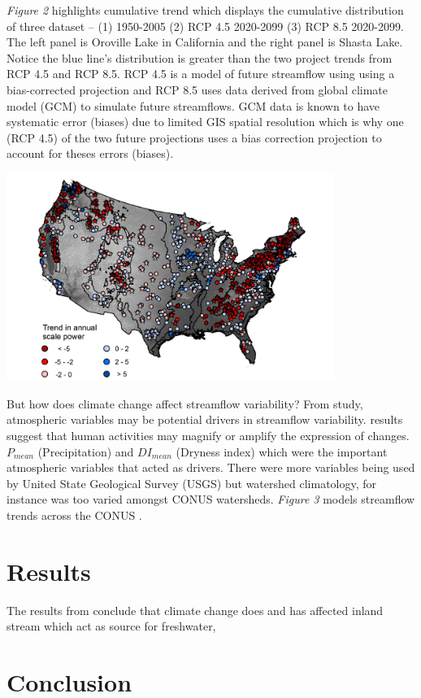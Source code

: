 \documentclass[a4paper,man,biblatex]{apa6}
\begin{document}
\par \textit{Figure 2} highlights cumulative trend which displays the cumulative distribution of three dataset -- (1) 1950-2005 (2) RCP 4.5 2020-2099 (3) RCP 8.5 2020-2099. The left panel is Oroville Lake in California and the right panel is Shasta Lake. Notice the blue line's distribution is greater than the two project trends from RCP 4.5 and RCP 8.5. RCP 4.5 is a model of future streamflow using using a bias-corrected projection and RCP 8.5 uses data derived from global climate model (GCM) to simulate future streamflows. GCM data is known to have systematic error (biases) due to limited GIS spatial resolution which is why one (RCP 4.5) of the two future projections uses a bias correction projection to account for theses errors (biases).
\begin{center}
    \includegraphics[width=0.8\textwidth]{conus_trend}
    \label{fig:cdf}
\end{center}
\par But how does climate change affect streamflow variability? From \textcite{rice_2016} study, atmospheric variables may be potential drivers in streamflow variability. \textcite{rice_2016} results suggest that human activities may magnify or amplify the expression of changes. $P_\textit{mean}$ (Precipitation) and $DI_\textit{mean}$ (Dryness index) which were the important atmospheric variables that acted as drivers. There were more variables being used by United State Geological Survey (USGS) but watershed climatology, for instance was too varied amongst CONUS watersheds. \textit{Figure 3} models streamflow trends across the CONUS \autocite{rice_2016}.
\medskip

\section{Results} The results from \textcite{rice_2016} conclude that climate change does and has affected inland stream which act as source for freshwater,

\section{Conclusion}  

\printbibliography
\end{document}
